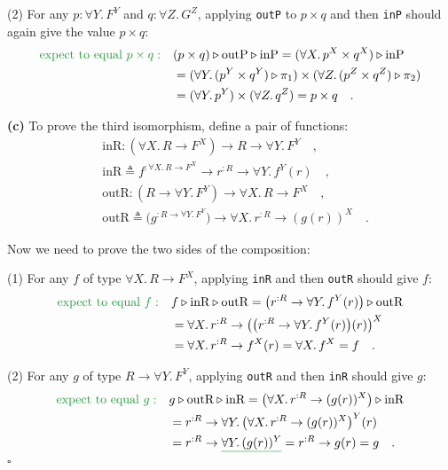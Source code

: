 (2) For any $p:\forall Y.\,F^{Y}$ and $q:\forall Z.\,G^{Z}$, applying
\lstinline!outP! to $p\times q$ and then \lstinline!inP! should
again give the value $p\times q$:
\begin{align*}
{\color{greenunder}\text{expect to equal }p\times q:}\quad & (p\times q)\triangleright\text{outP}\triangleright\text{inP}=(\forall X.\,p^{X}\times q^{X})\triangleright\text{inP}\\
 & =(\forall Y.\,(p^{Y}\times q^{Y})\triangleright\pi_{1})\times(\forall Z.\,(p^{Z}\times q^{Z})\triangleright\pi_{2})\\
 & =(\forall Y.\,p^{Y})\times(\forall Z.\,q^{Z})=p\times q\quad.
\end{align*}

\textbf{(c)} To prove the third isomorphism, define a pair of functions:
\begin{align*}
 & \text{inR}:(\forall X.\,R\rightarrow F^{X})\rightarrow R\rightarrow\forall Y.\,F^{Y}\quad,\\
 & \text{inR}\triangleq f^{:\forall X.\,R\rightarrow F^{X}}\rightarrow r^{:R}\rightarrow\forall Y.\,f^{Y}(r)\quad,\\
 & \text{outR}:(R\rightarrow\forall Y.\,F^{Y})\rightarrow\forall X.\,R\rightarrow F^{X}\quad,\\
 & \text{outR}\triangleq\big(g^{:R\rightarrow\forall Y.\,F^{Y}}\big)\rightarrow\forall X.\,r^{:R}\rightarrow(g(r))^{X}\quad.
\end{align*}

Now we need to prove the two sides of the composition:

(1) For any $f$ of type $\forall X.\,R\rightarrow F^{X}$, applying
\lstinline!inR! and then \lstinline!outR! should give $f$:
\begin{align*}
{\color{greenunder}\text{expect to equal }f:}\quad & f\triangleright\text{inR}\triangleright\text{outR}=\big(r^{:R}\rightarrow\forall Y.\,f^{Y}(r)\big)\triangleright\text{outR}\\
 & =\forall X.\,r^{:R}\rightarrow\big(\big(r^{:R}\rightarrow\forall Y.\,f^{Y}(r)\big)(r)\big)^{X}\\
 & =\forall X.\,r^{:R}\rightarrow f^{X}(r)=\forall X.\,f^{X}=f\quad.
\end{align*}

(2) For any $g$ of type $R\rightarrow\forall Y.\,F^{Y}$, applying
\lstinline!outR! and then \lstinline!inR! should give $g$:
\begin{align*}
{\color{greenunder}\text{expect to equal }g:}\quad & g\triangleright\text{outR}\triangleright\text{inR}=\big(\forall X.\,r^{:R}\rightarrow(g(r))^{X}\big)\triangleright\text{inR}\\
 & =r^{:R}\rightarrow\forall Y.\,\big(\forall X.\,r^{:R}\rightarrow(g(r))^{X}\big)^{Y}(r)\\
 & =r^{:R}\rightarrow\gunderline{\forall Y.\,(g(r))^{Y}}=r^{:R}\rightarrow g(r)=g\quad.
\end{align*}
$\square$

